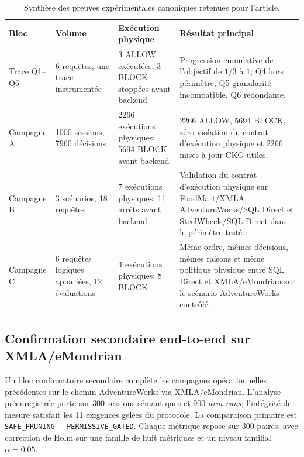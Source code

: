 \begin{table}[t]
\centering
\caption{Synthèse des preuves expérimentales canoniques retenues pour l'article.}
\label{tab:experimental-evidence-final}
\small
\begin{tabular}{p{}p{}p{}p{}}
\hline
Bloc & Volume & Exécution physique & Résultat principal \\
\hline
Trace Q1--Q6
& 6 requêtes, une trace instrumentée
& 3 ALLOW exécutées, 3 BLOCK stoppées avant backend
& Progression cumulative de l'objectif de $1/3$ à $1$; Q4 hors périmètre, Q5 granularité incompatible, Q6 redondante. \\

Campagne A
& 1000 sessions, 7960 décisions
& 2266 exécutions physiques; 5694 BLOCK avant backend
& 2266 ALLOW, 5694 BLOCK, zéro violation du contrat d'exécution physique et 2266 mises à jour CKG utiles. \\

Campagne B
& 3 scénarios, 18 requêtes
& 7 exécutions physiques; 11 arrêts avant backend
& Validation du contrat d'exécution physique sur FoodMart/XMLA, AdventureWorks/SQL Direct et SteelWheels/SQL Direct dans le périmètre testé. \\

Campagne C
& 6 requêtes logiques appariées, 12 évaluations
& 4 exécutions physiques; 8 BLOCK
& Même ordre, mêmes décisions, mêmes raisons et même politique physique entre SQL Direct et XMLA/eMondrian sur le scénario AdventureWorks contrôlé. \\
\hline
\end{tabular}
\end{table}

\subsection{Confirmation secondaire end-to-end sur XMLA/eMondrian}
\label{subsec:r3e14-xmla-resource-confirmation}

Un bloc confirmatoire secondaire complète les campagnes opérationnelles précédentes sur le
chemin AdventureWorks via XMLA/eMondrian. L'analyse préenregistrée porte sur 300 sessions
sémantiques et 900 \emph{arm-runs}; l'intégrité de mesure satisfait les 11 exigences gelées
du protocole. La comparaison primaire est \texttt{SAFE\_PRUNING} $-$
\texttt{PERMISSIVE\_GATED}. Chaque métrique repose sur 300 paires, avec correction de Holm
sur une famille de huit métriques et un niveau familial $\alpha=0.05$.


